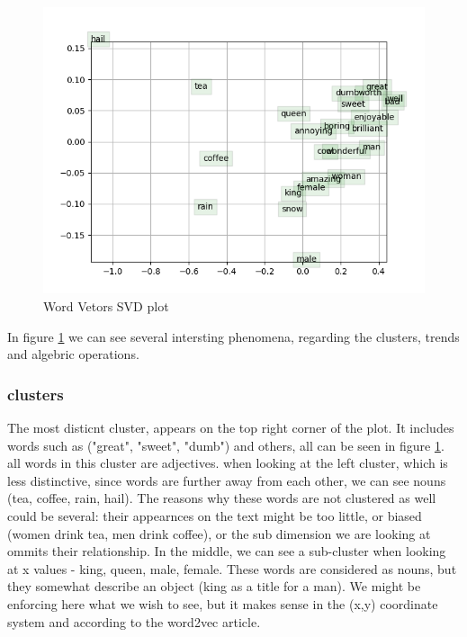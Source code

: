 \documentclass{article}
\begin{document}
\subsection{}

\begin{figure}
  \includegraphics[width=\linewidth]{word_vectors.png}
  \caption{Word Vetors  SVD plot}
  \label{word_vectors}
\end{figure}

In figure \ref{word_vectors} we can see several intersting phenomena, regarding the clusters, trends and algebric operations.
\subsubsection{clusters}
The most disticnt cluster, appears on the top right corner of the plot. It includes words such as ("great", "sweet", "dumb") and others, all can be seen in figure \ref{word_vectors}. all words in this cluster are adjectives.
when looking at the left cluster, which is less distinctive, since words are further away from each other, we can see nouns (tea, coffee, rain, hail). The reasons why these words are not clustered as well could be several: their appearnces on the text might be too little, or biased (women drink tea, men drink coffee), or the sub dimension we are looking at ommits their relationship. 
In the middle, we can see a sub-cluster when looking at x values - king, queen, male, female. These words are considered as nouns, but they somewhat describe an object (king as a title for a man). We might be enforcing here what we wish to see, but it makes sense in the (x,y) coordinate system and according to the word2vec article.
\end{document}
